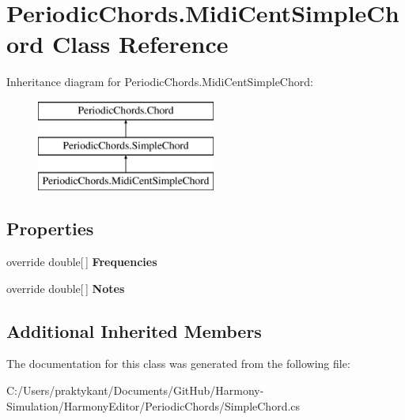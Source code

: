 \hypertarget{class_periodic_chords_1_1_midi_cent_simple_chord}{\section{Periodic\+Chords.\+Midi\+Cent\+Simple\+Chord Class Reference}
\label{class_periodic_chords_1_1_midi_cent_simple_chord}
}
Inheritance diagram for Periodic\+Chords.\+Midi\+Cent\+Simple\+Chord\+:\begin{figure}[H]
\begin{center}
\leavevmode
\includegraphics[height=3.000000cm]{class_periodic_chords_1_1_midi_cent_simple_chord}
\end{center}
\end{figure}
\subsection*{Properties}
\begin{DoxyCompactItemize}
\item 
\hypertarget{class_periodic_chords_1_1_midi_cent_simple_chord_a717c9bbbd90aea19cf949b02bbe6f1d5}{override double\mbox{[}$\,$\mbox{]} {\bfseries Frequencies}}\label{class_periodic_chords_1_1_midi_cent_simple_chord_a717c9bbbd90aea19cf949b02bbe6f1d5}

\item 
\hypertarget{class_periodic_chords_1_1_midi_cent_simple_chord_a6e61b7c207ec293d2f72846550ddf879}{override double\mbox{[}$\,$\mbox{]} {\bfseries Notes}}\label{class_periodic_chords_1_1_midi_cent_simple_chord_a6e61b7c207ec293d2f72846550ddf879}

\end{DoxyCompactItemize}
\subsection*{Additional Inherited Members}


The documentation for this class was generated from the following file\+:\begin{DoxyCompactItemize}
\item 
C\+:/\+Users/praktykant/\+Documents/\+Git\+Hub/\+Harmony-\/\+Simulation/\+Harmony\+Editor/\+Periodic\+Chords/Simple\+Chord.\+cs\end{DoxyCompactItemize}
